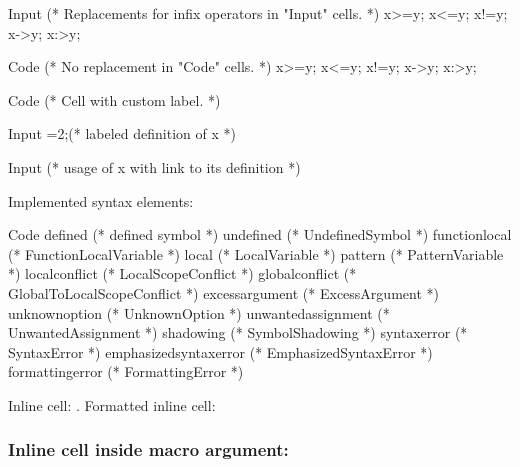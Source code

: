 \begin{mmaCell}{Input}
  (* Replacements for infix operators in "Input" cells. *)
  x>=y; x<=y; x!=y; x->y; x:>y;
\end{mmaCell}
\begin{mmaCell}{Code}
  (* No replacement in "Code" cells. *)
  x>=y; x<=y; x!=y; x->y; x:>y;
\end{mmaCell}
\begin{mmaCell}[label={}]{Code}
  (* Cell with custom label. *)
\end{mmaCell}
\begin{mmaCell}{Input}
  =2;(* labeled definition of x *)
\end{mmaCell}
\begin{mmaCell}{Input}
  (* usage of x with link to its definition *)
\end{mmaCell}

Implemented syntax elements:
\begin{mmaCell}[
  defined=defined,
  undefined=undefined,
  functionlocal=functionlocal,
  local=local,
  pattern=pattern,
  localconflict=localconflict,
  globalconflict=globalconflict,
  excessargument=excessargument,
  unknownoption=unknownoption,
  unwantedassignment=unwantedassignment,
  shadowing=shadowing,
  syntaxerror=syntaxerror,
  emphasizedsyntaxerror=emphasizedsyntaxerror,
  formattingerror=formattingerror,
]{Code}
   defined (*  defined symbol *)
   undefined (* UndefinedSymbol *)
   functionlocal (* FunctionLocalVariable *)
   local (* LocalVariable *)
   pattern (* PatternVariable *)
   localconflict (* LocalScopeConflict *)
   globalconflict (* GlobalToLocalScopeConflict *)
   excessargument (* ExcessArgument *)
   unknownoption (* UnknownOption *)
   unwantedassignment (* UnwantedAssignment *)
   shadowing (* SymbolShadowing *)
   syntaxerror (* SyntaxError *)
   emphasizedsyntaxerror (* EmphasizedSyntaxError *)
   formattingerror (* FormattingError *)
\end{mmaCell}

Inline cell: .
Formatted inline cell:
\subsubsection*{
  Inline cell inside macro argument:
}


\cleardoublepage